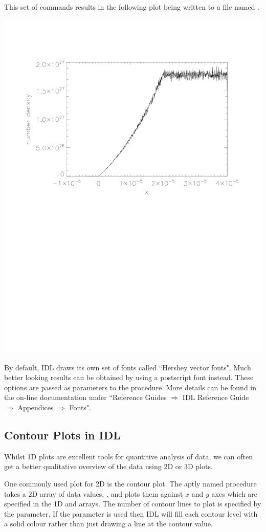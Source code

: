   This set of commands results in the following plot being written to
  a file named .
  \begin{center}
    \includegraphics[width=0.8\linewidth]{images/idl_ps_plot}
  \end{center}
  By default, IDL draws its own set of fonts called ``Hershey vector fonts".
  Much better looking results can be obtained by using a postscript font
  instead. These options are passed as parameters to the 
  procedure. More details can be found in the on-line documentation under
  ``Reference Guides $\Rightarrow$ IDL Reference Guide $\Rightarrow$
  Appendices $\Rightarrow$ Fonts".

\subsection{Contour Plots in IDL}
  Whilst 1D plots are excellent tools for quantitive analysis of data,
  we can often get a better qualitative overview of the data using 2D
  or 3D plots.

  One commonly used plot for 2D is the contour plot. The aptly named
   procedure takes a 2D array of data values, ,
  and plots them against $x$ and $y$ axes which are specified in the
  1D  and  arrays. The number of contour lines to plot is
  specified by the  parameter. If the  parameter
  is used then IDL will fill each contour level with a solid colour rather
  than just drawing a line at the contour value.

